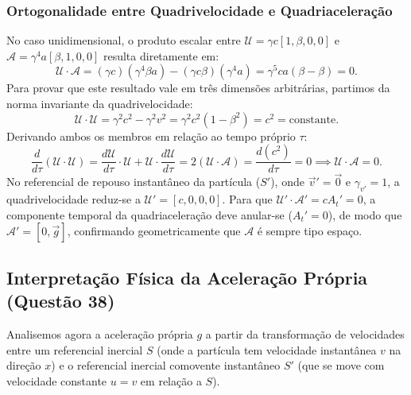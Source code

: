 \documentclass[11pt, a4paper]{article}
\begin{document}
\subsubsection{Ortogonalidade entre Quadrivelocidade e Quadriaceleração}
No caso unidimensional, o produto escalar entre $\mathcal{U} = \gamma c [1, \beta, 0, 0]$ e $\mathcal{A} = \gamma^4 a [\beta, 1, 0, 0]$ resulta diretamente em:
\begin{equation}
\mathcal{U} \cdot \mathcal{A} = (\gamma c)(\gamma^4 \beta a) - (\gamma c \beta)(\gamma^4 a) = \gamma^5 c a (\beta - \beta) = 0.
\end{equation}
Para provar que este resultado vale em três dimensões arbitrárias, partimos da norma invariante da quadrivelocidade:
\begin{equation}
\mathcal{U} \cdot \mathcal{U} = \gamma^2 c^2 - \gamma^2 v^2 = \gamma^2 c^2 (1 - \beta^2) = c^2 = \text{constante}.
\end{equation}
Derivando ambos os membros em relação ao tempo próprio $\tau$:
\begin{equation}
\frac{d}{d\tau} (\mathcal{U} \cdot \mathcal{U}) = \frac{d\mathcal{U}}{d\tau} \cdot \mathcal{U} + \mathcal{U} \cdot \frac{d\mathcal{U}}{d\tau} = 2 (\mathcal{U} \cdot \mathcal{A}) = \frac{d(c^2)}{d\tau} = 0 \implies \mathcal{U} \cdot \mathcal{A} = 0.
\end{equation}
No referencial de repouso instantâneo da partícula ($S'$), onde $\vec{v}' = \vec{0}$ e $\gamma_{v'} = 1$, a quadrivelocidade reduz-se a $\mathcal{U}' = [c, 0, 0, 0]$. Para que $\mathcal{U}' \cdot \mathcal{A}' = c A_t' = 0$, a componente temporal da quadriaceleração deve anular-se ($A_t' = 0$), de modo que $\mathcal{A}' = [0, \vec{g}]$, confirmando geometricamente que $\mathcal{A}$ é sempre tipo espaço.

\subsection{Interpretação Física da Aceleração Própria (Questão 38)}

Analisemos agora a aceleração própria $g$ a partir da transformação de velocidades entre um referencial inercial $S$ (onde a partícula tem velocidade instantânea $v$ na direção $x$) e o referencial inercial comovente instantâneo $S'$ (que se move com velocidade constante $u = v$ em relação a $S$).
\end{document}
